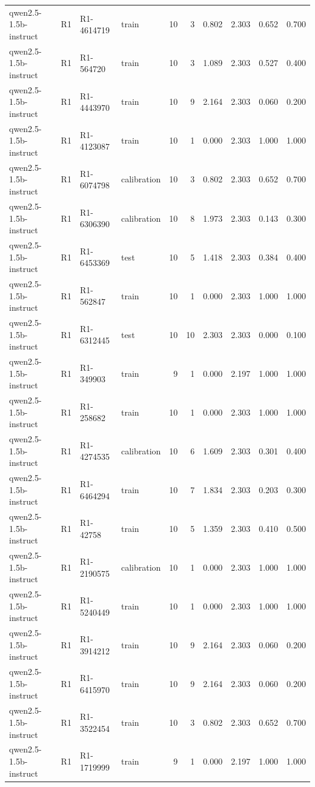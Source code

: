 \begin{table}
\begin{tabular}{llllrrrrrr}
qwen2.5-1.5b-instruct & R1 & R1-4614719 & train & 10 & 3 & 0.802 & 2.303 & 0.652 & 0.700 \\
qwen2.5-1.5b-instruct & R1 & R1-564720 & train & 10 & 3 & 1.089 & 2.303 & 0.527 & 0.400 \\
qwen2.5-1.5b-instruct & R1 & R1-4443970 & train & 10 & 9 & 2.164 & 2.303 & 0.060 & 0.200 \\
qwen2.5-1.5b-instruct & R1 & R1-4123087 & train & 10 & 1 & 0.000 & 2.303 & 1.000 & 1.000 \\
qwen2.5-1.5b-instruct & R1 & R1-6074798 & calibration & 10 & 3 & 0.802 & 2.303 & 0.652 & 0.700 \\
qwen2.5-1.5b-instruct & R1 & R1-6306390 & calibration & 10 & 8 & 1.973 & 2.303 & 0.143 & 0.300 \\
qwen2.5-1.5b-instruct & R1 & R1-6453369 & test & 10 & 5 & 1.418 & 2.303 & 0.384 & 0.400 \\
qwen2.5-1.5b-instruct & R1 & R1-562847 & train & 10 & 1 & 0.000 & 2.303 & 1.000 & 1.000 \\
qwen2.5-1.5b-instruct & R1 & R1-6312445 & test & 10 & 10 & 2.303 & 2.303 & 0.000 & 0.100 \\
qwen2.5-1.5b-instruct & R1 & R1-349903 & train & 9 & 1 & 0.000 & 2.197 & 1.000 & 1.000 \\
qwen2.5-1.5b-instruct & R1 & R1-258682 & train & 10 & 1 & 0.000 & 2.303 & 1.000 & 1.000 \\
qwen2.5-1.5b-instruct & R1 & R1-4274535 & calibration & 10 & 6 & 1.609 & 2.303 & 0.301 & 0.400 \\
qwen2.5-1.5b-instruct & R1 & R1-6464294 & train & 10 & 7 & 1.834 & 2.303 & 0.203 & 0.300 \\
qwen2.5-1.5b-instruct & R1 & R1-42758 & train & 10 & 5 & 1.359 & 2.303 & 0.410 & 0.500 \\
qwen2.5-1.5b-instruct & R1 & R1-2190575 & calibration & 10 & 1 & 0.000 & 2.303 & 1.000 & 1.000 \\
qwen2.5-1.5b-instruct & R1 & R1-5240449 & train & 10 & 1 & 0.000 & 2.303 & 1.000 & 1.000 \\
qwen2.5-1.5b-instruct & R1 & R1-3914212 & train & 10 & 9 & 2.164 & 2.303 & 0.060 & 0.200 \\
qwen2.5-1.5b-instruct & R1 & R1-6415970 & train & 10 & 9 & 2.164 & 2.303 & 0.060 & 0.200 \\
qwen2.5-1.5b-instruct & R1 & R1-3522454 & train & 10 & 3 & 0.802 & 2.303 & 0.652 & 0.700 \\
qwen2.5-1.5b-instruct & R1 & R1-1719999 & train & 9 & 1 & 0.000 & 2.197 & 1.000 & 1.000 \\

\end{tabular}
\end{table}
